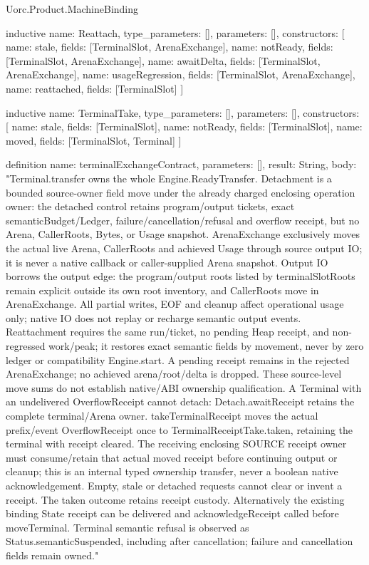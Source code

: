 \begin{lexlean}{Uorc.Product.MachineBinding}
\begin{semanticmodule}
inductive{
  name: Reattach,
  type_parameters: [],
  parameters: [],
  constructors: [
    {name: stale, fields: [TerminalSlot, ArenaExchange]},
    {name: notReady, fields: [TerminalSlot, ArenaExchange]},
    {name: awaitDelta, fields: [TerminalSlot, ArenaExchange]},
    {name: usageRegression, fields: [TerminalSlot, ArenaExchange]},
    {name: reattached, fields: [TerminalSlot]}
  ]
}

inductive{
  name: TerminalTake,
  type_parameters: [],
  parameters: [],
  constructors: [
    {name: stale, fields: [TerminalSlot]},
    {name: notReady, fields: [TerminalSlot]},
    {name: moved, fields: [TerminalSlot, Terminal]}
  ]
}

definition{
  name: terminalExchangeContract,
  parameters: [],
  result: String,
  body: "Terminal.transfer owns the whole Engine.ReadyTransfer. Detachment is a bounded source-owner field move under the already charged enclosing operation owner: the detached control retains program/output tickets, exact semanticBudget/Ledger, failure/cancellation/refusal and overflow receipt, but no Arena, CallerRoots, Bytes, or Usage snapshot. ArenaExchange exclusively moves the actual live Arena, CallerRoots and achieved Usage through source output IO; it is never a native callback or caller-supplied Arena snapshot. Output IO borrows the output edge: the program/output roots listed by terminalSlotRoots remain explicit outside its own root inventory, and CallerRoots move in ArenaExchange. All partial writes, EOF and cleanup affect operational usage only; native IO does not replay or recharge semantic output events. Reattachment requires the same run/ticket, no pending Heap receipt, and non-regressed work/peak; it restores exact semantic fields by movement, never by zero ledger or compatibility Engine.start. A pending receipt remains in the rejected ArenaExchange; no achieved arena/root/delta is dropped. These source-level move sums do not establish native/ABI ownership qualification. A Terminal with an undelivered OverflowReceipt cannot detach: Detach.awaitReceipt retains the complete terminal/Arena owner. takeTerminalReceipt moves the actual prefix/event OverflowReceipt once to TerminalReceiptTake.taken, retaining the terminal with receipt cleared. The receiving enclosing SOURCE receipt owner must consume/retain that actual moved receipt before continuing output or cleanup; this is an internal typed ownership transfer, never a boolean native acknowledgement. Empty, stale or detached requests cannot clear or invent a receipt. The taken outcome retains receipt custody. Alternatively the existing binding State receipt can be delivered and acknowledgeReceipt called before moveTerminal. Terminal semantic refusal is observed as Status.semanticSuspended, including after cancellation; failure and cancellation fields remain owned."
}


\end{semanticmodule}
\end{lexlean}
